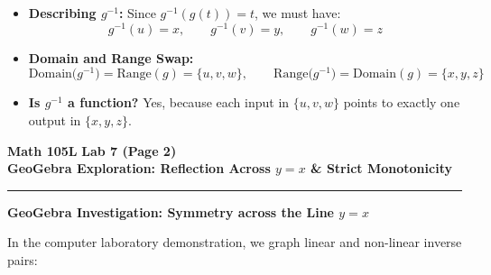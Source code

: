 \documentclass[10.5pt]{article}
\begin{document}
\begin{itemize}[leftmargin=1.2em, topsep=1pt, itemsep=2pt]
  \item \textbf{Describing $g^{-1}$:} Since $g^{-1}(g(t)) = t$, we must have:
  \[
    g^{-1}(u) = x, \qquad g^{-1}(v) = y, \qquad g^{-1}(w) = z
  \]
  \item \textbf{Domain and Range Swap:}
  \[
    \text{Domain}\big(g^{-1}\big) = \text{Range}(g) = \{u, v, w\}, \qquad \text{Range}\big(g^{-1}\big) = \text{Domain}(g) = \{x, y, z\}
  \]
  \item \textbf{Is $g^{-1}$ a function?} Yes, because each input in $\{u, v, w\}$ points to exactly one output in $\{x, y, z\}$.
\end{itemize}

\newpage

\noindent \textbf{\large Math 105L} \hfill \textbf{\large Lab 7 (Page 2)}\\[1pt]
{\textbf{\Large GeoGebra Exploration: Reflection Across $y = x$ \& Strict Monotonicity}}\\[-5pt]
\rule{\textwidth}{1.2pt}

\vspace{0.03in}

\textbf{\large GeoGebra Investigation: Symmetry across the Line $y = x$}

In the computer laboratory demonstration, we graph linear and non-linear inverse pairs:
\end{document}
